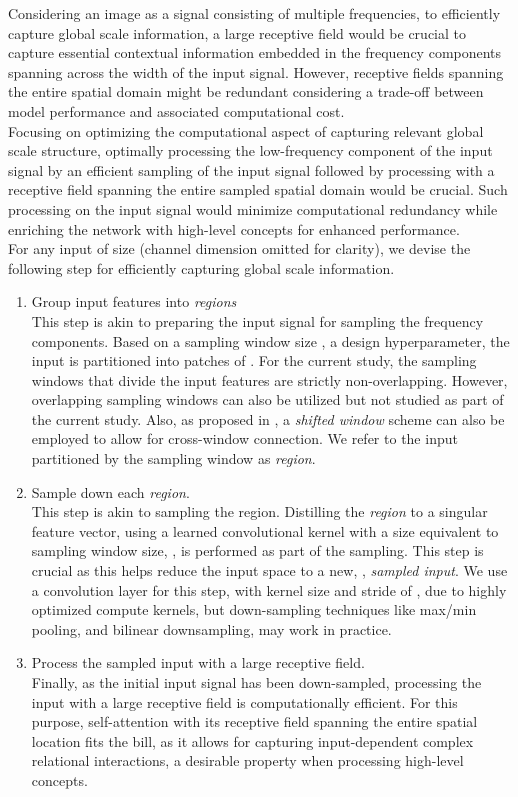 \documentclass{article}
\begin{document}
Considering an image as a signal consisting of multiple frequencies, to efficiently capture global scale information, a large receptive field would be crucial to capture essential contextual information embedded in the frequency components spanning across the width of the input signal. However, receptive fields spanning the entire spatial domain might be redundant considering a trade-off between model performance and associated computational cost. \\
\indent Focusing on optimizing the computational aspect of capturing relevant global scale structure, optimally processing the low-frequency component of the input signal by an efficient sampling of the input signal followed by processing with a receptive field spanning the entire sampled spatial domain would be crucial. Such processing on the input signal would minimize computational redundancy while enriching the network with high-level concepts for enhanced performance. \\
For any input of size  (channel dimension omitted for clarity), we devise the following step for efficiently capturing global scale information. \label{steps:mixr}
\begin{enumerate}
    \item Group input features into \textit{regions} \\
    This step is akin to preparing the input signal for sampling the frequency components. Based on a sampling window size , a design hyperparameter, the input is partitioned into patches of . For the current study, the sampling windows that divide the input features are strictly non-overlapping. However, overlapping sampling windows can also be utilized but not studied as part of the current study. Also, as proposed in \cite{DBLP:journals/corr/Swin}, a \textit{shifted window} scheme can also be employed to allow for cross-window connection. We refer to the input partitioned by the sampling window as \textit{region}.
    \item Sample down each \textit{region}. \\
    This step is akin to sampling the region. Distilling the \textit{region} to a singular feature vector, using a learned convolutional kernel with a size equivalent to sampling window size, , is performed as part of the sampling. This step is crucial as this helps reduce the input space to a new, , \textit{sampled input}. We use a convolution layer for this step, with kernel size and stride of , due to highly optimized compute kernels, but down-sampling techniques like max/min pooling, and bilinear downsampling, may work in practice.
    \item \label{step:3} Process the sampled input with a large receptive field. \\
    Finally, as the initial input signal has been down-sampled, processing the input with a large receptive field is computationally efficient. For this purpose, self-attention with its receptive field spanning the entire spatial location fits the bill, as it allows for capturing input-dependent complex relational interactions, a desirable property when processing high-level concepts. 
\end{enumerate}
\end{document}
